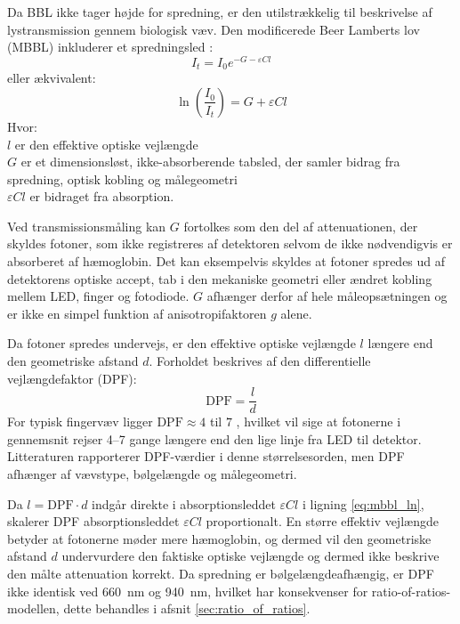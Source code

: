 Da BBL ikke tager højde for spredning, er den utilstrækkelig til beskrivelse af lystransmission gennem biologisk væv. Den modificerede Beer Lamberts lov (MBBL) inkluderer et spredningsled \cite[Eq.~(10.6)]{Tuchin2015} \cite[Eq.~(2)]{Barstow2019}:
\begin{equation}
    I_t = I_0 e^{-G - \varepsilon C l}
    \label{eq:mbbl}
\end{equation}
eller ækvivalent:
\begin{equation}
    \ln\!\left(\frac{I_0}{I_t}\right) = G + \varepsilon C l
    \label{eq:mbbl_ln}
\end{equation}
Hvor: \\ 
$l$ er den effektive optiske vejlængde\\ 
$G$ er et dimensionsløst, ikke-absorberende tabsled, der samler bidrag fra spredning, optisk kobling og målegeometri\\
$\varepsilon C l$ er bidraget fra absorption.

Ved transmissionsmåling kan $G$ fortolkes som den del af attenuationen, der skyldes fotoner, som ikke registreres af detektoren selvom de ikke nødvendigvis er absorberet af hæmoglobin. Det kan eksempelvis skyldes at fotoner spredes ud af detektorens optiske accept, tab i den mekaniske geometri eller ændret kobling mellem LED, finger og fotodiode. $G$ afhænger derfor af hele måleopsætningen og er ikke en simpel funktion af anisotropifaktoren $g$ alene.

Da fotoner spredes undervejs, er den effektive optiske vejlængde $l$ længere end den geometriske afstand $d$. Forholdet beskrives af den differentielle vejlængdefaktor (DPF):
\begin{equation}
    \text{DPF} = \frac{l}{d}
    \label{eq:dpf}
\end{equation}
For typisk fingervæv ligger $\text{DPF} \approx 4$ til $7$ \cite{Jacques2013} \cite{Barstow2019}, hvilket vil sige at fotonerne i gennemsnit rejser 4–7 gange længere end den lige linje fra LED til detektor. Litteraturen rapporterer DPF-værdier i denne størrelsesorden, men DPF afhænger af vævstype, bølgelængde og målegeometri. 

Da $l = \text{DPF} \cdot d$ indgår direkte i absorptionsleddet $\varepsilon C l$ i ligning \ref{eq:mbbl_ln}, skalerer DPF absorptionsleddet $\varepsilon Cl$ proportionalt. En større effektiv vejlængde betyder at fotonerne møder mere hæmoglobin, og dermed vil den geometriske afstand $d$ undervurdere den faktiske optiske vejlængde og dermed ikke beskrive den målte attenuation korrekt. Da spredning er bølgelængdeafhængig, er DPF ikke identisk ved \SI{660}{nm} og \SI{940}{nm}, hvilket har konsekvenser for ratio-of-ratios-modellen, dette behandles i afsnit \ref{sec:ratio_of_ratios}.

